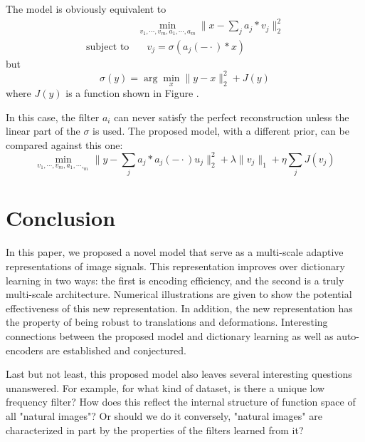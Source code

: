 \documentclass[a4paper]{article}
\begin{document}
{The model is obviously equivalent to 
\begin{equation}
	\begin{aligned}
		&\min_{v_1,\cdots,v_m,a_1,\cdots,a_m} \|x-\sum_j a_j*v_j\|_2^2  \\
		\textrm{subject to} & \quad v_j =\sigma(a_j(-\cdot)*x)
	\end{aligned}
\end{equation}
but 
\[
	\sigma(y)=\arg\min_x \|y-x\|_2^2 + J(y)
\]
where $J(y)$ is a function shown in Figure .

In this case, the filter $a_i$ can never satisfy the perfect reconstruction unless the linear part of the $\sigma$ is used. The proposed model, with a different prior, can be compared against this one:
\begin{equation}
	\min_{v_1,\cdots,v_m,a_1,\cdots,_m} \|y-\sum_j a_j*a_j(-\cdot)u_j\|_2^2 + \lambda \|v_j\|_1 + \eta \sum_j J(v_j)
\end{equation}
}








\newpage
\section{Conclusion}
In this paper, we proposed a novel model that serve as a multi-scale adaptive representations of image signals. This representation improves over dictionary learning in two ways: the first is encoding efficiency, and the second is a truly multi-scale architecture. Numerical illustrations are given to show the potential effectiveness of this new representation. In addition, the new representation has the property of being robust to translations and deformations. Interesting connections between the proposed model and dictionary learning as well as auto-encoders are established and conjectured. 

Last but not least, this proposed model also leaves several interesting questions unanswered. For example, for what kind of dataset, is there a unique low frequency filter? How does this reflect the internal structure of function space of all "natural images"? Or should we do it conversely, "natural images" are characterized in part by the properties of the filters learned from it?
\end{document}
